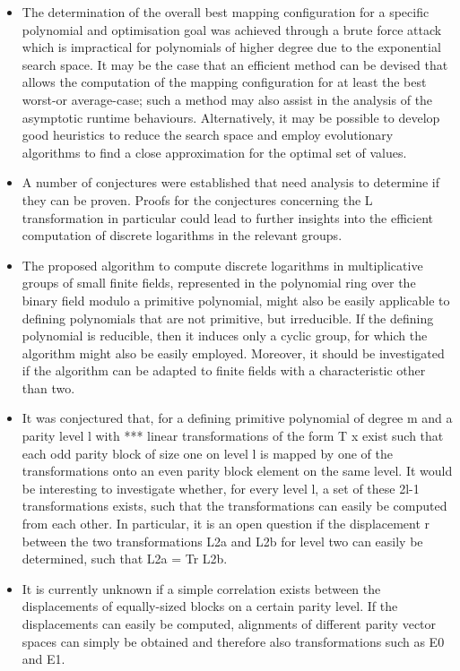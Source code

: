 \documentclass[oneside, a4paper, 11pt]{memoir}
\begin{document}
\begin{itemize}
\item The determination of the overall best mapping configuration for a specific polynomial and optimisation goal was achieved through a brute force attack which is impractical for polynomials of higher degree due to the exponential search space. It may be the case that an efficient method can be devised that allows the computation of the mapping configuration for at least the best worst-or average-case; such a method may also assist in the analysis of the asymptotic runtime behaviours. Alternatively, it may be possible to develop good heuristics to reduce the search space and employ evolutionary algorithms to find a close approximation for the optimal set of values.

\item A number of conjectures were established that need analysis to determine if they can be proven. Proofs for the conjectures concerning the L transformation in particular could lead to further insights into the efficient computation of discrete logarithms in the relevant groups.

\item The proposed algorithm to compute discrete logarithms in multiplicative groups of small finite fields, represented in the polynomial ring over the binary field modulo a primitive polynomial, might also be easily applicable to defining polynomials that are not primitive, but irreducible. If the defining polynomial is reducible, then it induces only a cyclic group, for which the algorithm might also be easily employed. Moreover, it should be investigated if the algorithm can be adapted to finite fields with a characteristic other than two.

\item It was conjectured that, for a defining primitive polynomial of degree m and a parity level l with *** linear transformations of the form T x exist such that each odd parity block of size one on level l is mapped by one of the transformations onto an even parity block element on the same level. It would be interesting to investigate whether, for every level l, a set of these 2l-1 transformations exists, such that the transformations can easily be computed from each other. In particular, it is an open question if the displacement r between the two transformations L2a and L2b for level two can easily be determined, such that L2a = Tr L2b.

\item It is currently unknown if a simple correlation exists between the displacements of equally-sized blocks on a certain parity level. If the displacements can easily be computed, alignments of different parity vector spaces can simply be obtained and therefore also transformations such as E0 and E1.
\end{itemize}
\end{document}

